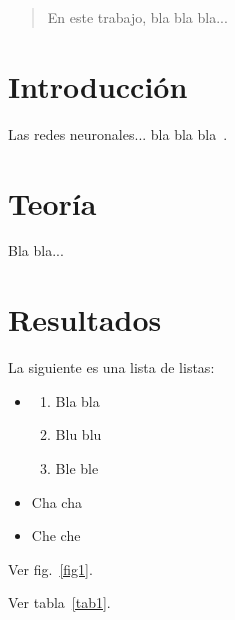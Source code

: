 \documentclass[aps,prl,twocolumn,groupedaddress]{revtex4-2}
\begin{document}
\begin{abstract}
En este trabajo, bla bla bla...
\end{abstract}


\maketitle

\section{Introducción}

Las redes neuronales... bla bla bla~\cite{hertz1999introduction}.

\section{Teoría}

Bla bla...

\section{Resultados}

La siguiente es una lista de listas:
\begin{itemize}
    \item
    \begin{enumerate}
        \item Bla bla
        \item Blu blu
        \item Ble ble
    \end{enumerate}
    \item Cha cha
    \item Che che
\end{itemize}

Ver fig.~\ref{fig1}.

Ver tabla~\ref{tab1}.
\end{document}
